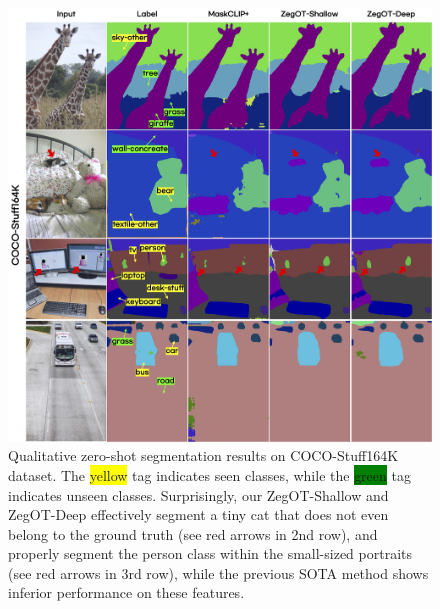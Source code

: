 \documentclass[nohyperref]{article}
\theoremstyle{plain}
\theoremstyle{definition}
\theoremstyle{remark}
\begin{document}
\pagebreak


\begin{figure}[!t]
\vskip 0.1in
\begin{center}
\includegraphics[width=0.97\linewidth]{fig/seg_appen.jpg}
\caption{Qualitative zero-shot segmentation results on COCO-Stuff164K dataset. The  \colorbox{yellow}{yellow} tag indicates seen classes, while the \colorbox{green}{green} tag indicates unseen classes. {Surprisingly, our ZegOT-Shallow and ZegOT-Deep effectively segment a tiny cat that does not even belong to the ground truth (see red arrows in 2nd row), and properly segment the person class within the small-sized portraits (see red arrows in 3rd row), while the previous SOTA method shows inferior performance on these features.} }
\label{fig_seg_appen}
\end{center}
\vskip -0.1in
\end{figure}


\end{document}
